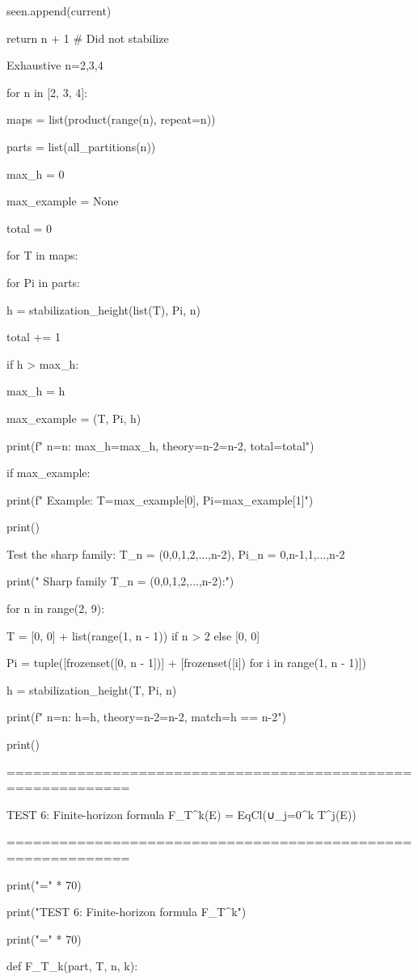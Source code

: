 seen.append(current)

return n + 1  # Did not stabilize


Exhaustive n=2,3,4


for n in [2, 3, 4]:

maps = list(product(range(n), repeat=n))

parts = list(all_partitions(n))

max_h = 0

max_example = None

total = 0

for T in maps:

for Pi in parts:

h = stabilization_height(list(T), Pi, n)

total += 1

if h > max_h:

max_h = h

max_example = (T, Pi, h)

print(f"  n={n}: max_h={max_h}, theory=n-2={n-2}, total={total}")

if max_example:

print(f"    Example: T={max_example[0]}, Pi={max_example[1]}")


print()


Test the sharp family: T_n = (0,0,1,2,...,n-2), Pi_n = {{0,n-1},{1},...,{n-2}}


print("  Sharp family T_n = (0,0,1,2,...,n-2):")

for n in range(2, 9):

T = [0, 0] + list(range(1, n - 1)) if n > 2 else [0, 0]

Pi = tuple([frozenset([0, n - 1])] + [frozenset([i]) for i in range(1, n - 1)])

h = stabilization_height(T, Pi, n)

print(f"    n={n}: h={h}, theory=n-2={n-2}, match={h == n-2}")


print()


============================================================


TEST 6: Finite-horizon formula F_T^k(E) = EqCl(∪_{j=0}^k T^j(E))


============================================================


print("=" * 70)

print("TEST 6: Finite-horizon formula F_T^k")

print("=" * 70)


def F_T_k(part, T, n, k):

